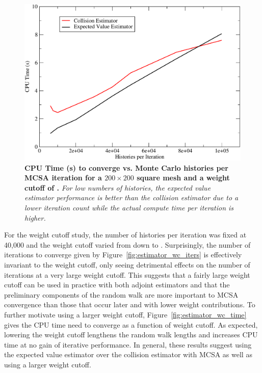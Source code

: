 \begin{figure}[t!]
  \centering
  \includegraphics[width=4.75in,clip]{chapters/mc_background/estimator_nh_time.pdf}
  \caption{\textbf{CPU Time (s) to converge vs. Monte Carlo histories
      per MCSA iteration for a $200 \times 200$ square mesh and a
      weight cutoff of .} \textit{For low numbers of
      histories, the expected value estimator performance is better
      than the collision estimator due to a lower iteration count
      while the actual compute time per iteration is higher.}}
  \label{fig:estimator_nh_time}
\end{figure}

For the weight cutoff study, the number of histories per iteration was
fixed at 40,000 and the weight cutoff varied from  down to
. Surprisingly, the number of iterations to converge given
by Figure~\ref{fig:estimator_wc_iters} is effectively invariant to the
weight cutoff, only seeing detrimental effects on the number of
iterations at a very large weight cutoff. This suggests that a fairly
large weight cutoff can be used in practice with both adjoint
estimators and that the preliminary components of the random walk are
more important to MCSA convergence than those that occur later and
with lower weight contributions. To further motivate using a larger
weight cutoff, Figure~\ref{fig:estimator_wc_time} gives the CPU time
need to converge as a function of weight cutoff. As expected, lowering
the weight cutoff lengthens the random walk lengths and increases CPU
time at no gain of iterative performance. In general, these results
suggest using the expected value estimator over the collision
estimator with MCSA as well as using a larger weight cutoff.

